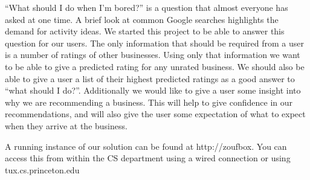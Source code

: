 \label{sec:problem}

``What should I do when I'm bored?''  is a question that almost everyone has
asked at one time. A brief look at common Google searches highlights the demand
for activity ideas. We started this project to be able to answer this question
for our users. The only information that should be required from a user is 
a number of ratings of other businesses. Using only that information we want to
be able to give a predicted rating for any unrated business. We should also be
able to give a user a list of their highest predicted ratings as a good answer
to ``what should I do?''. Additionally we would like to give a user some insight
into why we are recommending a business. This will help to give confidence in
our recommendations, and will also give the user some expectation of what to
expect when they arrive at the business.

A running instance of our solution can be found at http://zoufbox.
You can access this from within the CS department using a wired connection or using 
tux.cs.princeton.edu